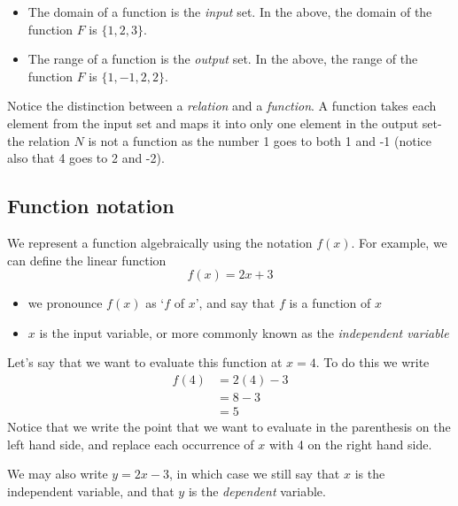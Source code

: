 \begin{itemize}
	\item The domain of a function is the {\em input} set. In the above, the domain of the function $F$ is $\{1,2,3\}$.
	\item The range of a function is the {\em output} set. In the above, the range of the function $F$ is $\{1,-1,2,2\}$.
\end{itemize} 
Notice the distinction between a {\em relation} and a {\em function}. A function takes each element from the input set and
maps it into only one element in the output set- the relation $N$ is not a function as the number 1 goes to both 1 and -1 (notice
also that 4 goes to 2 and -2).

\subsection{Function notation}
We represent a function algebraically using the notation $f(x)$. For example, we can define the \gls{linear} function
\[
	f(x)=2x+3
\]
\begin{itemize}
	\item we pronounce $f(x)$ as `$f$ of $x$', and say that $f$ is a function of $x$
	\item $x$ is the input \gls{variable}, or more commonly known as the {\em independent variable}
\end{itemize} 
Let's say that we want to evaluate this function at $x=4$. To do this we write
\begin{align*}
	f(4) & =		2(4)-3 \\
	     & =		8-3    \\
	     & =		5      
\end{align*} 
Notice that we write the \gls{point} that we want to evaluate in the parenthesis on the left hand side, 
and replace each occurrence of $x$ with 4 on the right hand side.

We may also write $y=2x-3$, in which case we still say that $x$ is the independent variable, 
and that $y$ is the {\em dependent} variable. 

